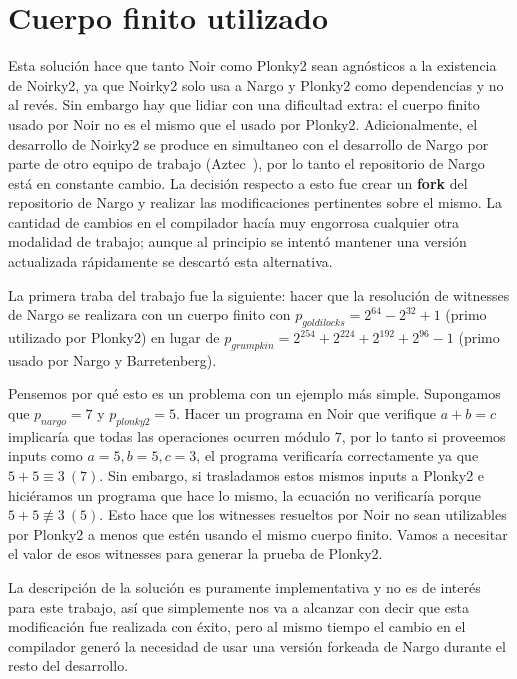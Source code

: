 \section{Cuerpo finito utilizado}
Esta solución hace que tanto Noir como Plonky2 sean agnósticos a la existencia de Noirky2, ya que Noirky2 solo usa a Nargo y Plonky2 como dependencias y no al revés. Sin embargo hay que lidiar con una dificultad extra: el cuerpo finito usado por Noir no es el mismo que el usado por Plonky2. Adicionalmente, el desarrollo de Noirky2 se produce en simultaneo con el desarrollo de Nargo por parte de otro equipo de trabajo (Aztec~\cite{Aztec}), por lo tanto el repositorio de Nargo está en constante cambio. La decisión respecto a esto fue crear un \textbf{fork} del repositorio de Nargo y realizar las modificaciones pertinentes sobre el mismo. La cantidad de cambios en el compilador hacía muy engorrosa cualquier otra modalidad de trabajo; aunque al principio se intentó mantener una versión actualizada rápidamente se descartó esta alternativa.

La primera traba del trabajo fue la siguiente: hacer que la resolución de witnesses de Nargo se realizara con un cuerpo finito con $p_{goldilocks} = 2^{64}-2^{32}+1$ (primo utilizado por Plonky2) en lugar de $p_{grumpkin}=2^{254}+2^{224}+2^{192}+2^{96}-1$ (primo usado por Nargo y Barretenberg). 

Pensemos por qué esto es un problema con un ejemplo más simple. Supongamos que $p_{nargo} = 7$ y $p_{plonky2} = 5$. Hacer un programa en Noir que verifique $a+b=c$ implicaría que todas las operaciones ocurren módulo $7$, por lo tanto si proveemos inputs como $a=5, b = 5, c = 3$, el programa verificaría correctamente ya que $5+5\equiv 3 ~ (7)$. Sin embargo, si trasladamos estos mismos inputs a Plonky2 e hiciéramos un programa que hace lo mismo, la ecuación no verificaría porque $5+5 \not\equiv 3 ~ (5)$. Esto hace que los witnesses resueltos por Noir no sean utilizables por Plonky2 a menos que estén usando el mismo cuerpo finito. Vamos a necesitar el valor de esos witnesses para generar la prueba de Plonky2. 

La descripción de la solución es puramente implementativa y no es de interés para este trabajo, así que simplemente nos va a alcanzar con decir que esta modificación fue realizada con éxito, pero al mismo tiempo el cambio en el compilador generó la necesidad de usar una versión forkeada de Nargo durante el resto del desarrollo. 


